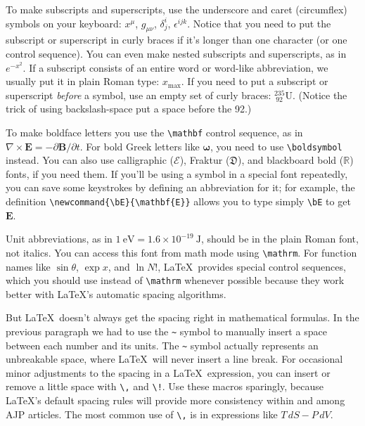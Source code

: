 \documentclass[prb,preprint]{revtex4-1}
\begin{document}
To make subscripts and superscripts, use the underscore and caret 
(circumflex) symbols on your keyboard: $x^\mu$, $g_{\mu\nu}$, $\delta^i_j$, 
$\epsilon^{ijk}$.  Notice that you need to put the subscript or superscript 
in curly braces if it's longer than one character (or one control sequence). 
You can even make nested subscripts and superscripts, as in $e^{-x^2}$.  
If a subscript consists of an entire word or word-like abbreviation, 
we usually put it in plain Roman type: $x_\textrm{max}$.  If you need to 
put a subscript or superscript \textit{before} a symbol, use an empty
set of curly braces: ${}^{235}_{\ 92}\textrm{U}$. (Notice the trick of using 
backslash-space put a space before the 92.)

\newcommand{\bE}{\mathbf{E}}   %

To make boldface letters you use the \verb/\mathbf/ control sequence, as in
$\nabla\times\mathbf{E} = -\partial\mathbf{B}/\partial t$.  For bold Greek
letters like $\boldsymbol{\omega}$, you need to use \verb/\boldsymbol/
instead.  You can also use calligraphic ($\mathcal{E}$), Fraktur 
($\mathfrak{D}$), and blackboard bold ($\mathbb{R}$) fonts, if you need them. 
If you'll be using a symbol in a special font repeatedly, you can save 
some keystrokes by defining an abbreviation for it; for example, the 
definition \verb/\newcommand{\bE}{\mathbf{E}}/ allows you to type simply 
\verb/\bE/ to get $\bE$.

Unit abbreviations, as in $1~\mathrm{eV} = 1.6\times10^{-19}~\mathrm{J}$,
should be in the plain Roman font, not italics.  You can access this font
from math mode using \verb/\mathrm/. For function names like $\sin\theta$, 
$\exp x$, and $\ln N!$, \LaTeX\ provides special control sequences, 
which you should use instead of \verb/\mathrm/ whenever possible because
they work better with \LaTeX's automatic spacing algorithms.

But \LaTeX\ doesn't always get the spacing right in mathematical formulas.
In the previous paragraph we had to use the \verb/~/ symbol to 
manually insert a space between each number and its units.  The \verb/~/
symbol actually represents an unbreakable space, where \LaTeX\ will never
insert a line break. For occasional minor adjustments to the spacing
in a \LaTeX\ expression, you can insert or remove a little 
space with \verb/\,/ and \verb/\!/.  Use these macros sparingly,
because \LaTeX's default spacing rules will provide more consistency
within and among AJP articles.  The most common use of \verb/\,/ 
is in expressions like $T\,dS - P\,dV$.
\end{document}
